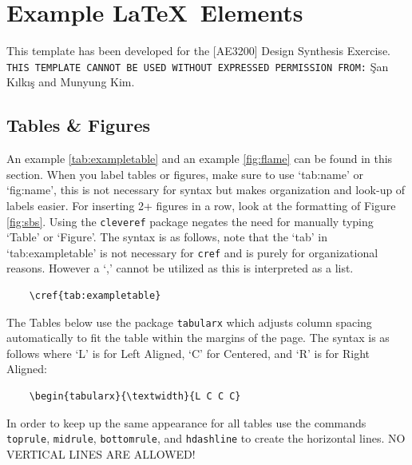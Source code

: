 \chapter{Example \LaTeX\ Elements}
This template has been developed for the [AE3200] Design Synthesis Exercise.
\texttt{THIS TEMPLATE CANNOT BE USED WITHOUT EXPRESSED PERMISSION FROM:}
\c{S}an K{\i}lk{\i}\c{s} and Munyung Kim.

\section{Tables \& Figures}
An example \cref{tab:exampletable} and an example \cref{fig:flame} can be found
in this section. When you label tables or figures, make sure to use `tab:name' 
or `fig:name', this is not necessary for syntax but makes organization and 
look-up of labels easier. For inserting 2+ figures in a row, look at the 
formatting of Figure \cref{fig:sbs}. Using the \texttt{cleveref} package 
negates the need for manually typing `Table' or `Figure'. The syntax is as 
follows, note that the `tab' in `tab:exampletable' is not necessary for 
\texttt{cref} and is purely for organizational reasons. However a `,' 
cannot be utilized as this is interpreted as a list.

\begin{verbatim}
    \cref{tab:exampletable}
\end{verbatim}

The Tables below use the package \texttt{tabularx} which adjusts column spacing
automatically to fit the table within the margins of the page. The syntax is as
follows where `L' is for Left Aligned, `C' for Centered, and `R' is for Right
Aligned:

\begin{verbatim}
    \begin{tabularx}{\textwidth}{L C C C}
\end{verbatim}

In order to keep up the same appearance for all tables use the commands 
\texttt{toprule}, \texttt{midrule}, \texttt{bottomrule}, and \texttt{hdashline} 
to create the horizontal lines. NO VERTICAL LINES ARE ALLOWED!

